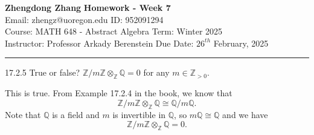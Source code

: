 \documentclass[a4paper, 12pt]{article}
\begin{document}
\noindent
\large\textbf{Zhengdong Zhang} \hfill \textbf{Homework - Week 7}   \\
Email: zhengz@uoregon.edu \hfill ID: 952091294 \\
\normalsize Course: MATH 648 - Abstract Algebra  \hfill Term: Winter 2025\\
Instructor: Professor Arkady Berenstein \hfill Due Date: $26^{th}$ February, 2025 \\
\noindent\rule{7in}{2.8pt}
\begin{problem}{17.2.5}
True or false? \(\mathbb{Z}/m \mathbb{Z}\otimes_{\mathbb{Z}}\mathbb{Q}=0\) for any \(m\in \mathbb{Z}_{>0}\).
\end{problem}
\begin{solution}
This is true. From Example 17.2.4 in the book, we know that 
\[\mathbb{Z}/m \mathbb{Z}\otimes_\mathbb{Z}\mathbb{Q}\cong \mathbb{Q}/m \mathbb{Q}.\]
Note that \(\mathbb{Q}\) is a field and \(m\) is invertible in \(\mathbb{Q}\), so \(m \mathbb{Q}\cong \mathbb{Q}\) and we have 
\[\mathbb{Z}/ m \mathbb{Z}\otimes_\mathbb{Z}\mathbb{Q}=0.\]
\end{solution}
\end{document}
